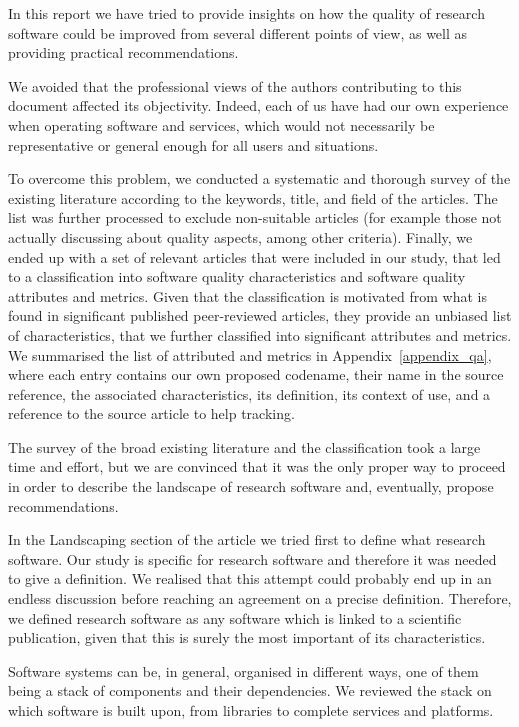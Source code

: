 
In this report we have tried to provide insights on how the quality of research software could be improved from several different points of view, as well as providing practical recommendations.

We avoided that the professional views of the authors contributing to this document affected its objectivity. Indeed, each of us have had our own experience when operating software and services, which would not necessarily be representative or general enough for all users and situations.

To overcome this problem, we conducted a systematic and thorough survey of the existing literature according to the keywords, title, and field of the articles. The list was further processed to exclude non-suitable articles (for example  those not actually discussing about quality aspects, among other criteria). Finally, we ended up with a set of relevant articles that were included in our study, that led to a classification into software quality characteristics and software quality attributes and metrics. Given that the classification is motivated from what is found in significant published peer-reviewed articles, they provide an unbiased list of characteristics, that we further classified into significant attributes and metrics. We summarised the list of attributed and metrics in Appendix~\ref{appendix_qa}, where each entry contains our own proposed codename, their name in the source reference, the associated characteristics, its definition, its context of use, and a reference to the source article to help tracking.

The survey of the broad existing literature and the classification took a large time and effort, but we are convinced that it was the only proper way to proceed in order to describe the landscape of research software and, eventually, propose recommendations.

In the Landscaping section of the article we tried first to define what research software. Our study is specific for research software and therefore it was needed to give a definition. We realised that this attempt could probably end up in an endless discussion before reaching an agreement on a precise definition. Therefore, we defined research software as any software which is linked to a scientific publication, given that this is surely the most important of its characteristics. 

Software systems can be, in general, organised in different ways, one of them being a stack of components and their dependencies. We reviewed the stack on which software is built upon, from libraries to complete services and platforms. 

